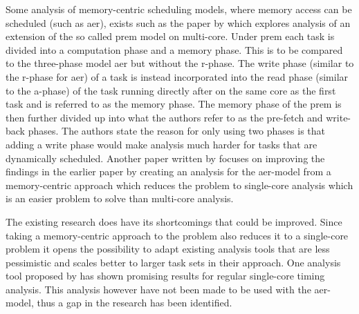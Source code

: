 \documentclass{kththesis}
\begin{document}
Some analysis of memory-centric scheduling models, where memory access can be scheduled (such as
\acrshort{aer}), exists such as the paper by \textcite{alhammad_schedulability_2014} which explores
analysis of an extension of the so called \acrfull{prem} model on multi-core. Under \acrshort{prem}
each task is divided into a computation phase and a memory phase. This is to be compared to the
three-phase model \acrshort{aer} but without the \acrshort{r}-phase. The write phase (similar to the
\acrshort{r}-phase for \acrshort{aer}) of a task is instead incorporated into the read phase
(similar to the \acrshort{a}-phase) of the task running directly after on the same core as the first
task and is referred to as the memory phase. The memory phase of the \acrshort{prem} is then further
divided up into what the authors refer to as the pre-fetch and write-back phases. The authors state
the reason for only using two phases is that adding a write phase would make analysis much harder
for tasks that are dynamically scheduled. Another paper written by
\textcite{maia_schedulability_2017} focuses on improving the findings in the earlier paper by creating
an analysis for the \acrshort{aer}-model from a memory-centric approach which reduces the problem to
single-core analysis which is an easier problem to solve than multi-core analysis.


The existing research does have its shortcomings that could be improved. Since taking a
memory-centric approach to the problem also reduces it to a single-core problem it opens the
possibility to adapt existing analysis tools that are less pessimistic and scales better to larger
task sets in their approach. One analysis tool proposed by \textcite{nasri_exact_2017} has shown
promising results for regular single-core timing analysis. This analysis however have not
been made to be used with the \acrshort{aer}-model, thus a gap in the research has been identified.


\end{document}

